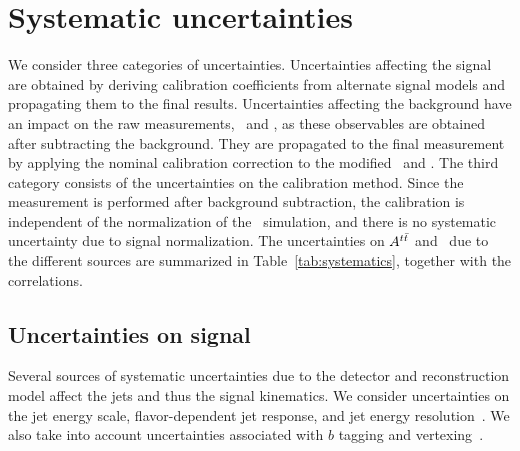 \documentclass[aps,prd,twocolumn,showpacs,superscriptaddress,groupedaddress,floatfix]{revtex4}
\begin{document}
\makeatletter{}
\section{Systematic uncertainties}
\label{sec:systematics}


We consider three categories of uncertainties.
Uncertainties affecting the signal
are obtained by deriving  calibration coefficients from  alternate signal models and propagating
them  to the final results.
Uncertainties affecting the background  have an impact on the raw measurements,
\Attraw\ and \Pttraw, as these observables are obtained after subtracting the background.
They
are propagated to the final measurement by applying the nominal calibration correction to the modified \Attraw\ and \Pttraw.
The third category consists of the uncertainties on the calibration method.
Since the measurement is performed after background subtraction,
the calibration is independent of the normalization of the \ttbar\ simulation,
and there is no systematic uncertainty due to signal normalization.
The uncertainties on $A^{t\bar t}$ and \Ptt\ due to the different sources  are summarized in Table~\ref{tab:systematics}, together with the  correlations.




\subsection{Uncertainties on signal}
Several sources of systematic uncertainties due to the detector and reconstruction model affect the jets and thus the signal kinematics.
We consider uncertainties on the jet energy scale, flavor-dependent jet response, and jet energy resolution~\cite{Abazov:2013hda}.
We also take into account uncertainties associated with  $b$ tagging  and vertexing~\cite{NIM_btaging}.
\end{document}
